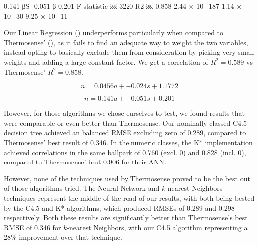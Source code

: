 \documentclass[../thesis/thesis.tex]{subfiles}
\begin{document}
0.141 βS -0.051 β 0.201
F-statistic ￼ 3220 R2 ￼ 0.858
2.44 × 10−187 1.14 × 10−30 9.25 × 10−11

Our Linear Regression () underperforms particularly when compared to Thermosense' (), as it fails to find an adequate way to weight the two variables, instead opting to basically exclude them from consideration by picking very small weights and adding a large constant factor. We get a correlation of $R^2 = 0.589$ vs Thermosense' $R^2 = 0.858$.

\begin{equation} \label{eq:linreg}
n =  0.0456a + -0.024s + 1.1772
\end{equation}

\begin{equation} \label{eq:thermolinreg}
n =  0.141a + -0.051s + 0.201
\end{equation}

However, for those algorithms we chose ourselves to test, we found results that were comparable or even better than Thermosense. Our nominally classed C4.5 decision tree achieved an balanced RMSE excluding zero of 0.289, compared to Thermosense' best result of 0.346. In the numeric classes, the K* implementation achieved correlations in the same ballpark of 0.760 (excl. 0) and 0.828 (incl. 0), compared to Thermosense' best 0.906 for their ANN.

However, none of the techniques used by Thermosense proved to be the best out of those algorithms tried. The Neural Network and $k$-nearest Neighbors techniques represent the middle-of-the-road of our results, with both being bested by the C4.5 and K* algorithms, which produced RMSEs of 0.289 and 0.298 respectively. Both these results are significantly better than Thermosense's best RMSE of 0.346 for $k$-nearest Neighbors, with our C4.5 algorithm representing a 28\% improvement over that technique.



\end{document}
